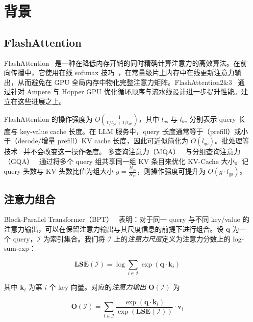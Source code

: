 \section{背景}
\label{sec:background}

\subsection{FlashAttention}
\label{sec:flashattention}

FlashAttention~\cite{dao2022flashattention} 是一种在降低内存开销的同时精确计算注意力的高效算法。在前向传播中，它使用在线 softmax 技巧~\cite{milakov2018onlinesoftmax}，在常量级片上内存中在线更新注意力输出，从而避免在 GPU 全局内存中物化完整注意力矩阵。FlashAttention2\&3~\cite{dao2023flashattention2,jay2024flashattention3} 通过针对 Ampere 与 Hopper GPU 优化循环顺序与流水线设计进一步提升性能。\sys 建立在这些进展之上。

FlashAttention 的操作强度为 $O\left(\frac{1}{1/l_{qo} + 1/l_{kv}}\right)$，其中 $l_{qo}$ 与 $l_{kv}$ 分别表示 query 长度与 key-value cache 长度。在 LLM 服务中，query 长度通常等于（prefill）或小于（decode/增量 prefill）KV cache 长度，因此可近似简化为 $O(l_{qo})$。批处理等技术~\cite{yu2022orca} 并不会改变这一操作强度。
多查询注意力（MQA）~\cite{shazeer2019mqa} 与分组查询注意力（GQA）~\cite{ainslie2023gqa} 通过将多个 query 组共享同一组 KV 条目来优化 KV-Cache 大小。记 query 头数与 KV 头数比值为组大小 $g = \frac{H_{qo}}{H_{kv}}$，则操作强度可提升为 $O(g \cdot l_{qo})$。

\subsection{注意力组合}
\label{sec:attention-composition}

Block-Parallel Transformer（BPT）~\cite{liu2023blockparalleltransformer} 表明：对于同一 query 与不同 key/value 的注意力输出，可以在保留注意力输出与其尺度信息的前提下进行组合。设 \(\mathbf{q}\) 为一个 query，\(\mathcal{I}\) 为索引集合。我们将 \(\mathcal{I}\) 上的\emph{注意力尺度}定义为注意力分数上的 log-sum-exp：

\begin{equation}
    \mathbf{LSE}(\mathcal{I}) = \log \sum_{i \in \mathcal{I}} \exp(\mathbf{q} \cdot \mathbf{k}_i)
\end{equation}

其中 \(\mathbf{k}_i\) 为第 \(i\) 个 key 向量。对应的\emph{注意力输出} \(\mathbf{O}(\mathcal{I})\) 为


\begin{equation}
    \mathbf{O}(\mathcal{I}) = \sum_{i \in \mathcal{I}} \frac{\exp(\mathbf{q} \cdot \mathbf{k}_i)}{\exp(\mathbf{LSE}(\mathcal{I}))} \cdot \mathbf{v}_i
\end{equation}

